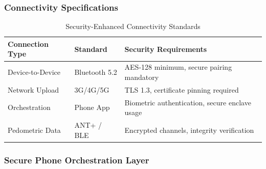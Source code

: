 \documentclass[12pt,a4paper]{article}
\begin{document}
\subsubsection{Connectivity Specifications}

\begin{table}[h]
\centering
\begin{tabular}{|l|l|p{6cm}|}
\hline
\textbf{Connection Type} & \textbf{Standard} & \textbf{Security Requirements} \\
\hline
Device-to-Device & Bluetooth 5.2 & AES-128 minimum, secure pairing mandatory \\
\hline
Network Upload & 3G/4G/5G & TLS 1.3, certificate pinning required \\
\hline
Orchestration & Phone App & Biometric authentication, secure enclave usage \\
\hline
Pedometric Data & ANT+ / BLE & Encrypted channels, integrity verification \\
\hline
\end{tabular}
\caption{Security-Enhanced Connectivity Standards}
\end{table}

\subsubsection{Secure Phone Orchestration Layer}
\end{document}
